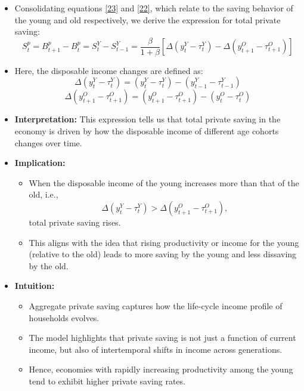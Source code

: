 \documentclass[12pt]{article}
\begin{document}
\begin{itemize}
  \item Consolidating equations \eqref{23} and \eqref{22}, which relate to the saving behavior of the young and old respectively, we derive the expression for total private saving:
  \[
  S_t^p = B_{t+1}^p - B_t^p = S_t^Y - S_{t-1}^Y = \frac{\beta}{1 + \beta} \left[ \Delta (y_t^Y - \tau_t^Y) - \Delta (y_{t+1}^O - \tau_{t+1}^O) \right] \tag{24}
  \]
  
  \item Here, the disposable income changes are defined as:
  \[
  \Delta (y_t^Y - \tau_t^Y) = (y_t^Y - \tau_t^Y) - (y_{t-1}^Y - \tau_{t-1}^Y)
  \]
  \[
  \Delta (y_{t+1}^O - \tau_{t+1}^O) = (y_{t+1}^O - \tau_{t+1}^O) - (y_t^O - \tau_t^O)
  \]

  \item \textbf{Interpretation:} This expression tells us that total private saving in the economy is driven by how the disposable income of different age cohorts changes over time.

  \item \textbf{Implication:} 
  \begin{itemize}
    \item When the disposable income of the young increases more than that of the old, i.e., 
    \[
    \Delta (y_t^Y - \tau_t^Y) > \Delta (y_{t+1}^O - \tau_{t+1}^O),
    \]
    total private saving rises.
    
    \item This aligns with the idea that rising productivity or income for the young (relative to the old) leads to more saving by the young and less dissaving by the old.
  \end{itemize}

  \item \textbf{Intuition:} 
  \begin{itemize}
    \item Aggregate private saving captures how the life-cycle income profile of households evolves.
    \item The model highlights that private saving is not just a function of current income, but also of intertemporal shifts in income across generations.
    \item Hence, economies with rapidly increasing productivity among the young tend to exhibit higher private saving rates.
  \end{itemize}
\end{itemize}
\end{document}
